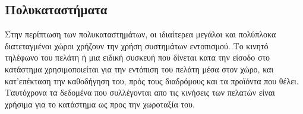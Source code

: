 \subsection{Πολυκαταστήματα}
Στην περίπτωση των πολυκαταστημάτων, οι ιδιαίτερεα μεγάλοι και πολύπλοκα διατεταγμένοι χώροι χρήζουν την χρήση συστημάτων εντοπισμού\cite{spinclabs}. Το κινητό τηλέφωνο του πελάτη ή μια ειδική συσκευή που δίνεται κατα την είσοδο στο κατάστημα χρησιμοποιείται για την εντόπιση του πελάτη μέσα στον χώρο, και κατ'επέκταση την καθοδήγηση του, πρός τους διαδρόμους και τα προϊόντα που θέλει. Ταυτόχρονα τα δεδομένα που συλλέγονται απο τις κινήσεις των πελατών είναι χρήσιμα για το κατάστημα ως προς την χωροταξία του.
